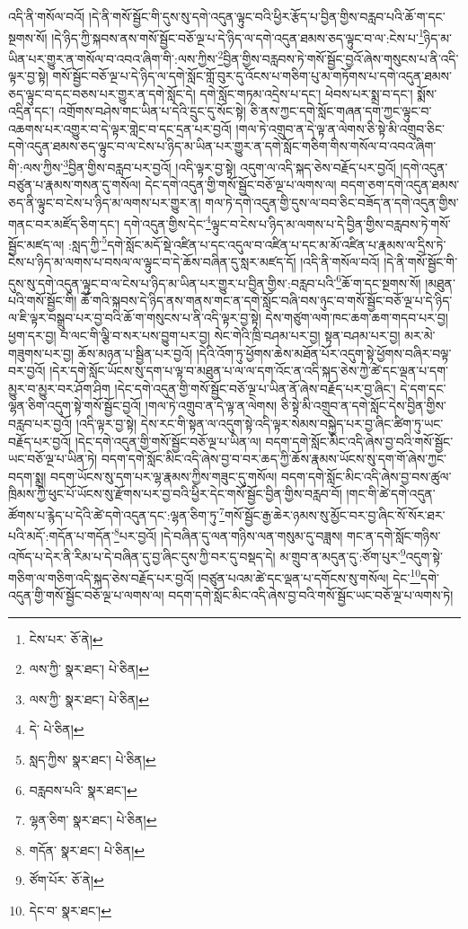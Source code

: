 འདི་ནི་གསོལ་བའོ། །དེ་ནི་གསོ་སྦྱོང་གི་དུས་སུ་དགེ་འདུན་ལྟུང་བའི་ཕྱིར་རྩོད་པ་བྱིན་གྱིས་བརླབ་པའི་ཆོ་ག་དང་སྔགས་སོ། །དེ་ཉིད་ཀྱི་སྐབས་ནས་གསོ་སྦྱོང་བཅོ་ལྔ་པ་དེ་ཉིད་ལ་དགེ་འདུན་ཐམས་ཅད་ལྟུང་བ་ལ་:ངེས་པ་\footnote{ངེས་པར་  ཅོ་ནེ། }ཉིད་མ་ཡིན་པར་གྱུར་ན་གསོལ་བ་འབའ་ཞིག་གི་:ལས་ཀྱིས་\footnote{ལས་ཀྱི་  སྣར་ཐང་།  པེ་ཅིན། }བྱིན་གྱིས་བརླབས་ཏེ་གསོ་སྦྱོང་བྱའོ་ཞེས་གསུངས་པ་ནི་འདི་ལྟར་བྱ་སྟེ། གསོ་སྦྱོང་བཅོ་ལྔ་པ་དེ་ཉིད་ལ་དགེ་སློང་གློ་བུར་དུ་འོངས་པ་གཅིག་པུ་མ་གཏོགས་པ་དགེ་འདུན་ཐམས་ཅད་ལྟུང་བ་དང་བཅས་པར་གྱུར་ན་དགེ་སློང་དེ། དགེ་སློང་གཏམ་འདྲེས་པ་དང་། ཕེབས་པར་སྨྲ་བ་དང་། སྨོས་འདྲིན་དང་། འགྲོགས་བཤེས་གང་ཡིན་པ་དེའི་དྲུང་དུ་སོང་སྟེ། ཅི་ནས་ཀྱང་དགེ་སློང་གཞན་དག་ཀྱང་ལྟུང་བ་འཆགས་པར་འགྱུར་བ་དེ་ལྟར་གླེང་བ་དང་དྲན་པར་བྱའོ། །གལ་ཏེ་འགྲུབ་ན་དེ་ལྟ་ན་ལེགས་ཅི་སྟེ་མི་འགྲུབ་ཅིང་དགེ་འདུན་ཐམས་ཅད་ལྟུང་བ་ལ་ངེས་པ་ཉིད་མ་ཡིན་པར་གྱུར་ན་དགེ་སློང་གཅིག་གིས་གསོལ་བ་འབའ་ཞིག་གི་:ལས་ཀྱིས་\footnote{ལས་ཀྱི་  སྣར་ཐང་།  པེ་ཅིན། }བྱིན་གྱིས་བརླབ་པར་བྱའོ། །འདི་ལྟར་བྱ་སྟེ། འདུག་ལ་འདི་སྐད་ཅེས་བརྗོད་པར་བྱའོ། །དགེ་འདུན་བཙུན་པ་རྣམས་གསན་དུ་གསོལ། དེང་དགེ་འདུན་གྱི་གསོ་སྦྱོང་བཅོ་ལྔ་པ་ལགས་ལ། བདག་ཅག་དགེ་འདུན་ཐམས་ཅད་ནི་ལྟུང་བ་ངེས་པ་ཉིད་མ་ལགས་པར་གྱུར་ན། གལ་ཏེ་དགེ་འདུན་གྱི་དུས་ལ་བབ་ཅིང་བཟོད་ན་དགེ་འདུན་གྱིས་གནང་བར་མཛོད་ཅིག་དང་། དགེ་འདུན་གྱིས་དེང་\footnote{དེ་  པེ་ཅིན། }ལྟུང་བ་ངེས་པ་ཉིད་མ་ལགས་པ་དེ་བྱིན་གྱིས་བརླབས་ཏེ་གསོ་སྦྱོང་མཛད་ལ། :སླད་ཀྱི་\footnote{སླད་ཀྱིས་  སྣར་ཐང་།  པེ་ཅིན། }དགེ་སློང་མདོ་སྡེ་འཛིན་པ་དང་འདུལ་བ་འཛིན་པ་དང་མ་མོ་འཛིན་པ་རྣམས་ལ་དྲིས་ཏེ་ངེས་པ་ཉིད་མ་ལགས་པ་བསལ་ལ་ལྟུང་བ་དེ་ཆོས་བཞིན་དུ་སླར་མཛད་དོ། །འདི་ནི་གསོལ་བའོ། །དེ་ནི་གསོ་སྦྱོང་གི་དུས་སུ་དགེ་འདུན་ལྟུང་བ་ལ་ངེས་པ་ཉིད་མ་ཡིན་པར་གྱུར་པ་བྱིན་གྱིས་:བརླབ་པའི་\footnote{བརླབས་པའི་  སྣར་ཐང་། }ཆོ་ག་དང་སྔགས་སོ། །མཐུན་པའི་གསོ་སྦྱོང་གི། ཆོ་གའི་སྐབས་དེ་ཉིད་ནས་གནས་གང་ན་དགེ་སློང་བཞི་བས་ཉུང་བ་གསོ་སྦྱོང་བཅོ་ལྔ་པ་དེ་ཉིད་ལ་ཇི་ལྟར་བསྒྲུབ་པར་བྱ་བའི་ཆོ་ག་གསུངས་པ་ནི་འདི་ལྟར་བྱ་སྟེ། དེས་གཙུག་ལག་ཁང་ཆག་ཆག་གདབ་པར་བྱ། ཕྱག་དར་བྱ། བ་ལང་གི་ལྕི་བ་སར་པས་བྱུག་པར་བྱ། སེང་གེའི་ཁྲི་བཤམ་པར་བྱ། སྟན་བཤམ་པར་བྱ། མར་མེ་གཟུགས་པར་བྱ། ཆོས་མཉན་པ་སྦྱིན་པར་བྱའོ། །དེའི་འོག་ཏུ་ཕྱོགས་ཆེས་མཐོན་པོར་འདུག་སྟེ་ཕྱོགས་བཞིར་བལྟ་བར་བྱའོ། །དེར་དགེ་སློང་ཡོངས་སུ་དག་པ་ལྟ་བ་མཐུན་པ་ལ་ལ་དག་འོང་ན་འདི་སྐད་ཅེས་ཀྱེ་ཚེ་དང་ལྡན་པ་དག་མྱུར་བ་མྱུར་བར་ཤོག་ཤིག །དེང་དགེ་འདུན་གྱི་གསོ་སྦྱོང་བཅོ་ལྔ་པ་ཡིན་ནོ་ཞེས་བརྗོད་པར་བྱ་ཞིང་། དེ་དག་དང་ལྷན་ཅིག་འདུག་སྟེ་གསོ་སྦྱོང་བྱའོ། །གལ་ཏེ་འགྲུབ་ན་དེ་ལྟ་ན་ལེགས། ཅི་སྟེ་མི་འགྲུབ་ན་དགེ་སློང་དེས་བྱིན་གྱིས་བརླབ་པར་བྱའོ། །འདི་ལྟར་བྱ་སྟེ། དེས་རང་གི་སྟན་ལ་འདུག་སྟེ་འདི་ལྟར་སེམས་བསྐྱེད་པར་བྱ་ཞིང་ཚིག་ཏུ་ཡང་བརྗོད་པར་བྱའོ། །དེང་དགེ་འདུན་གྱི་གསོ་སྦྱོང་བཅོ་ལྔ་པ་ཡིན་ལ། བདག་དགེ་སློང་མིང་འདི་ཞེས་བྱ་བའི་གསོ་སྦྱོང་ཡང་བཅོ་ལྔ་པ་ཡིན་ཏེ། བདག་དགེ་སློང་མིང་འདི་ཞེས་བྱ་བ་བར་ཆད་ཀྱི་ཆོས་རྣམས་ཡོངས་སུ་དག་གོ་ཞེས་ཀྱང་བདག་སྨྲ། བདག་ཡོངས་སུ་དག་པར་ལྷ་རྣམས་ཀྱིས་གཟུང་དུ་གསོལ། བདག་དགེ་སློང་མིང་འདི་ཞེས་བྱ་བས་ཚུལ་ཁྲིམས་ཀྱི་ཕུང་པོ་ཡོངས་སུ་རྫོགས་པར་བྱ་བའི་ཕྱིར་དེང་གསོ་སྦྱོང་བྱིན་གྱིས་བརླབ་བོ། །གང་གི་ཚེ་དགེ་འདུན་ཚོགས་པ་རྙེད་པ་དེའི་ཚེ་དགེ་འདུན་དང་:ལྷན་ཅིག་ཏུ་\footnote{ལྷན་ཅིག་  སྣར་ཐང་།  པེ་ཅིན། }གསོ་སྦྱོང་རྒྱ་ཆེར་ཉམས་སུ་མྱོང་བར་བྱ་ཞིང་སོ་སོར་ཐར་པའི་མདོ་:གདོན་པ་གདོན་\footnote{གདོན་  སྣར་ཐང་།  པེ་ཅིན། }པར་བྱའོ། །དེ་བཞིན་དུ་ལན་གཉིས་ལན་གསུམ་དུ་བཟླས། གང་ན་དགེ་སློང་གཉིས་འཁོད་པ་དེར་ནི་རིམ་པ་དེ་བཞིན་དུ་བྱ་ཞིང་དུས་ཀྱི་བར་དུ་བསྡད་དེ། མ་གྲུབ་ན་མདུན་དུ་:ཙོག་པུར་\footnote{ཙོག་པོར་  ཅོ་ནེ། }འདུག་སྟེ་གཅིག་ལ་གཅིག་འདི་སྐད་ཅེས་བརྗོད་པར་བྱའོ། །བཙུན་པའམ་ཚེ་དང་ལྡན་པ་དགོངས་སུ་གསོལ། དེང་\footnote{དེང་བ་  སྣར་ཐང་། }དགེ་འདུན་གྱི་གསོ་སྦྱོང་བཅོ་ལྔ་པ་ལགས་ལ། བདག་དགེ་སློང་མིང་འདི་ཞེས་བྱ་བའི་གསོ་སྦྱོང་ཡང་བཅོ་ལྔ་པ་ལགས་ཏེ། 